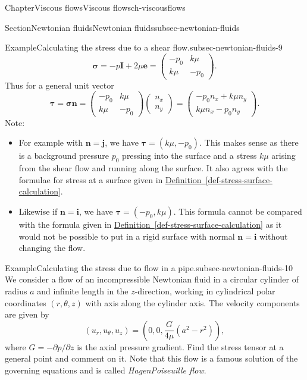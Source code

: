 \documentclass[oneside,10pt,]{book}
\newcommand{\xreffont}{\relax}
\numberwithin{equation}{section}
\newcommand{\be}{\boldsymbol{e}}
\newcommand{\bn}{\boldsymbol{n}}
\newcommand{\bsigma}{\boldsymbol{\sigma}}
\newcommand{\btau}{\boldsymbol{\tau}}
\newcommand{\bI}{\boldsymbol{I}}
\newcommand{\bi}{\boldsymbol{i}}
\newcommand{\bj}{\boldsymbol{j}}
\begin{document}
\begin{chapterptx}{Chapter}{Viscous flows}{}{Viscous flows}{}{}{ch-viscousflows}
\begin{sectionptx}{Section}{Newtonian fluids}{}{Newtonian fluids}{}{}{subsec-newtonian-fluids}
\begin{example}{Example}{Calculating the stress due to a shear flow.}{subsec-newtonian-fluids-9}
\begin{equation*}
\bsigma=-p\bI+2\mu\be
=\left(\begin{matrix}-p_0&k\mu\\k\mu&-p_0\end{matrix}\right).
\end{equation*}
Thus for a general unit vector%
\begin{equation*}
\btau=\bsigma\bn
=\left(\begin{matrix}-p_0&k\mu\\k\mu&-p_0\end{matrix}\right)\left(\begin{matrix}n_x\\n_y\end{matrix}\right)
=\left(\begin{matrix}-p_0n_x+k\mu n_y\\k\mu n_x-p_0n_y\end{matrix}\right).
\end{equation*}
Note:%
\begin{itemize}[label=\textbullet]
\item{}For example with \(\bn=\bj\), we have \(\btau=(k\mu,-p_0)\). This makes sense as there is a background pressure \(p_0\) pressing into the surface and a stress \(k\mu\) arising from the shear flow and running along the surface. It also agrees with the formulae for stress at a surface given in \hyperref[def-stress-surface-calculation]{Definition~{\xreffont\ref{def-stress-surface-calculation}}}.%
\item{}Likewise if \(\bn=\bi\), we have \(\btau=(-p_0,k\mu)\). This formula cannot be compared with the formula given in \hyperref[def-stress-surface-calculation]{Definition~{\xreffont\ref{def-stress-surface-calculation}}} as it would not be possible to put in a rigid surface with normal \(\bn=\bi\) without changing the flow.%
\end{itemize}
%
\end{example}
\begin{example}{Example}{Calculating the stress due to flow in a pipe.}{subsec-newtonian-fluids-10}%
We consider a flow of an incompressible Newtonian fluid in a circular cylinder of radius \(a\) and infinite length in the \(z\)-direction, working in cylindrical polar coordinates \((r,\theta,z)\) with axis along the cylinder axis. The velocity components are given by%
\begin{equation*}
(u_r,u_\theta,u_z)=\left(0,0,\frac{G}{4\mu}\left(a^2-r^2\right)\right),
\end{equation*}
where \(G=-\partial p/\partial z\) is the axial pressure gradient. Find the stress tensor at a general point and comment on it. Note that this flow is a famous solution of the governing equations and is called \emph{Hagen\textendash{}Poiseuille flow}.%

\end{example}
\end{sectionptx}
\end{chapterptx}
\end{document}
